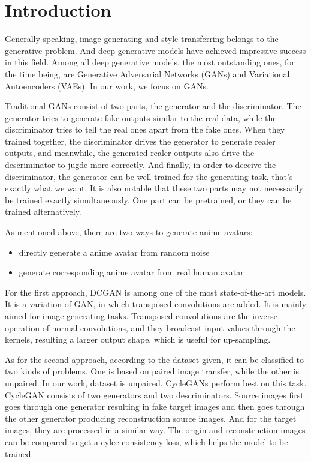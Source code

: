 \documentclass[10pt,twocolumn,letterpaper]{article}
\begin{document}
\section{Introduction}

Generally speaking, image generating and style transferring belongs to the
generative problem. And deep generative models have achieved impressive success
in this field. Among all deep generative models, the most outstanding ones, for
the time being, are Generative Adversarial Networks (GANs) and Variational
Autoencoders (VAEs). In our work, we focus on GANs.

Traditional GANs consist of two parts, the generator and the discriminator. The
generator tries to generate fake outputs similar to the real data, while the
discriminator tries to tell the real ones apart from the fake ones. When they
trained together, the discriminator drives the generator to generate realer
outputs, and meanwhile, the generated realer outputs also drive the
descriminator to jugde more correctly. And finally, in order to deceive the
discriminator, the generator can be well-trained for the generating task, that's
exactly what we want. It is also notable that these two parts may not
necessarily be trained exactly simultaneously. One part can be pretrained, or
they can be trained alternatively.

As mentioned above, there are two ways to generate anime avatars:

\begin{itemize}[noitemsep, topsep=0pt]
   \item directly generate a anime avatar from random noise
   \item generate corresponding anime avatar from real human avatar
\end{itemize}

For the first approach, DCGAN is among one of the most state-of-the-art models.
It is a variation of GAN, in which transposed convolutions are added. It is
mainly aimed for image generating tasks. Transposed convolutions are the inverse
operation of normal convolutions, and they broadcast input values through the
kernels, resulting a larger output shape, which is useful for up-sampling.

As for the second approach, according to the dataset given, it can be classified
to two kinds of problems. One is based on paired image transfer, while the other
is unpaired. In our work, dataset is unpaired. CycleGANs perform best on this
task. CycleGAN consists of two generators and two descriminators. Source images
first goes through one generator resulting in fake target images and then goes
through the other generator producing reconstruction source images. And for the
target images, they are processed in a similar way. The origin and
reconstruction images can be compared to get a cylce consistency loss, which
helps the model to be trained.
\end{document}
